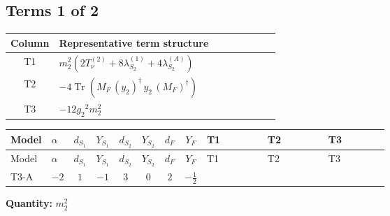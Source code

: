 \documentclass[8pt]{article}
\begin{document}
\begin{landscape}
\subsection*{Terms 1 of 2}
\begin{center}
\begin{tabular}{@{}c >{\raggedright\arraybackslash}p{0.82\linewidth}@{}}
\toprule
Column & Representative term structure \\
\midrule
T1 & \(\displaystyle {m_2^2} (2 T_{\nu}^{(2)}+8 {\lambda_{S_2}^{(1)}}+4 {\lambda_{S_2}^{(A)}})\) \\
\midrule
T2 & \(\displaystyle -4 \operatorname{Tr}\!\left({M_F}\,\left({y_2}\right)^{\dagger}\,{y_2}\,\left({M_F}\right)^{\dagger}\right)\) \\
\midrule
T3 & \(\displaystyle -12 {g_2}^2 {m_2^2}\) \\
\midrule
\bottomrule
\end{tabular}
\end{center}
\smallskip
\tiny
\begin{longtable}{@{}llcccccc >{\raggedright\arraybackslash}p{0.21\linewidth} >{\raggedright\arraybackslash}p{0.21\linewidth} >{\raggedright\arraybackslash}p{0.21\linewidth}@{}}
\toprule
Model & $\alpha$ & $d_{S_1}$ & $Y_{S_1}$ & $d_{S_2}$ & $Y_{S_2}$ & $d_F$ & $Y_F$ & T1 & T2 & T3 \\
\midrule
\endfirsthead
\toprule
Model & $\alpha$ & $d_{S_1}$ & $Y_{S_1}$ & $d_{S_2}$ & $Y_{S_2}$ & $d_F$ & $Y_F$ & T1 & T2 & T3 \\
\midrule
\endhead
T3-A & $-2$ & $1$ & $-1$ & $3$ & $0$ & $2$ & $-\frac{1}{2}$ & \scriptsize\adjustbox{max width=\linewidth}{$\begin{gathered} {m_2^2} (2 T_{\nu}^{(2)}+8 {\lambda_{S_2}^{(1)}}+4 {\lambda_{S_2}^{(A)}})\end{gathered}$} & \scriptsize\adjustbox{max width=\linewidth}{$\begin{gathered} -4 \operatorname{Tr}\!\left({M_F}\,\left({y_2}\right)^{\dagger}\,{y_2}\,\left({M_F}\right)^{\dagger}\right)\end{gathered}$} & \scriptsize\adjustbox{max width=\linewidth}{$\begin{gathered} -12 {g_2}^2 {m_2^2}\end{gathered}$} \\
\midrule
\bottomrule
\end{longtable}
\clearpage
\noindent\textbf{Quantity: }$m_2^2$\par\smallskip

\end{landscape}
\end{document}
